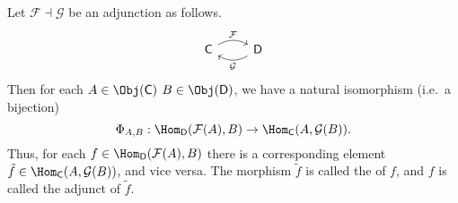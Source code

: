 \documentclass[notes.tex]{subfiles}
\begin{document}
\begin{definition}[adjunct]
  \label{def:adjunct}
  Let $\mathcal{F} \dashv \mathcal{G}$ be an adjunction as follows.
  \begin{equation*}
    \begin{tikzcd}
      \mathsf{C}
      \arrow[r, bend left, rightarrow, "\mathcal{F}"]
      & \mathsf{D}
      \arrow[l, bend left, rightarrow, "\mathcal{G}"]
    \end{tikzcd}
  \end{equation*}
  Then for each $A \in \Obj(\mathsf{C})$ $B \in \Obj(\mathsf{D})$, we have a natural isomorphism (i.e.\ a bijection)
  \begin{equation*}
    \Phi_{A, B}: \Hom_{\mathsf{D}}(\mathcal{F}(A), B) \to \Hom_{\mathsf{C}}(A, \mathcal{G}(B)).
  \end{equation*}
  Thus, for each $f \in \Hom_{\mathsf{D}}(\mathcal{F}(A), B)$ there is a corresponding element $\tilde{f} \in \Hom_{\mathsf{C}}(A, \mathcal{G}(B))$, and vice versa. The morphism $\tilde{f}$ is called the  of $f$, and $f$ is called the adjunct of $\tilde{f}$.
\end{definition}
\end{document}

